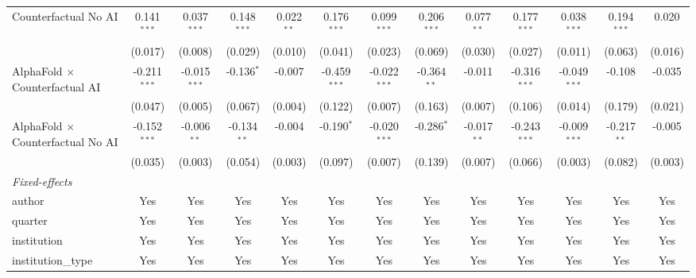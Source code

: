 \begin{tabular}{lcccccccccccc}
   Counterfactual No AI                     & 0.141$^{***}$  & 0.037$^{***}$  & 0.148$^{***}$ & 0.022$^{**}$ & 0.176$^{***}$  & 0.099$^{***}$  & 0.206$^{***}$ & 0.077$^{**}$  & 0.177$^{***}$  & 0.038$^{***}$  & 0.194$^{***}$ & 0.020\\   
                                            & (0.017)        & (0.008)        & (0.029)       & (0.010)      & (0.041)        & (0.023)        & (0.069)       & (0.030)       & (0.027)        & (0.011)        & (0.063)       & (0.016)\\   
   AlphaFold $\times$ Counterfactual AI     & -0.211$^{***}$ & -0.015$^{***}$ & -0.136$^{*}$  & -0.007       & -0.459$^{***}$ & -0.022$^{***}$ & -0.364$^{**}$ & -0.011        & -0.316$^{***}$ & -0.049$^{***}$ & -0.108        & -0.035\\   
                                            & (0.047)        & (0.005)        & (0.067)       & (0.004)      & (0.122)        & (0.007)        & (0.163)       & (0.007)       & (0.106)        & (0.014)        & (0.179)       & (0.021)\\   
   AlphaFold $\times$ Counterfactual No AI  & -0.152$^{***}$ & -0.006$^{**}$  & -0.134$^{**}$ & -0.004       & -0.190$^{*}$   & -0.020$^{***}$ & -0.286$^{*}$  & -0.017$^{**}$ & -0.243$^{***}$ & -0.009$^{***}$ & -0.217$^{**}$ & -0.005\\   
                                            & (0.035)        & (0.003)        & (0.054)       & (0.003)      & (0.097)        & (0.007)        & (0.139)       & (0.007)       & (0.066)        & (0.003)        & (0.082)       & (0.003)\\   
   \midrule
   \emph{Fixed-effects}\\
   author                                   & Yes            & Yes            & Yes           & Yes          & Yes            & Yes            & Yes           & Yes           & Yes            & Yes            & Yes           & Yes\\  
   quarter                                  & Yes            & Yes            & Yes           & Yes          & Yes            & Yes            & Yes           & Yes           & Yes            & Yes            & Yes           & Yes\\  
   institution                              & Yes            & Yes            & Yes           & Yes          & Yes            & Yes            & Yes           & Yes           & Yes            & Yes            & Yes           & Yes\\  
   institution\_type                        & Yes            & Yes            & Yes           & Yes          & Yes            & Yes            & Yes           & Yes           & Yes            & Yes            & Yes           & Yes\\  

\end{tabular}
